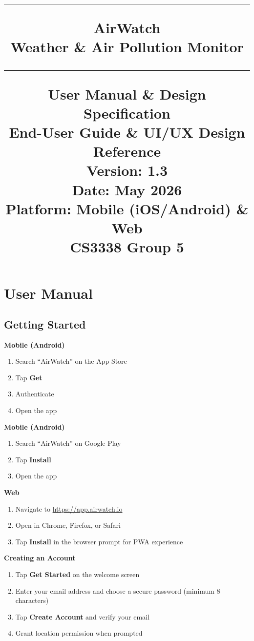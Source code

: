 \documentclass[11pt]{article}
\title{\noindent\rule{\textwidth}{0.5pt}
\huge{AirWatch} \vspace{0.1cm}\\ \large{Weather \& Air Pollution Monitor\\}
\noindent\rule{\textwidth}{0.5pt}
\Large{User Manual \& Design Specification \\\small{End-User Guide \& UI/UX Design Reference\\}}
\vspace{0.1cm}
\small{ 
Version: 1.3\\ 
Date: May 2026\\
Platform: Mobile (iOS/Android) \& Web\\
CS3338 Group  5}
}
\date{}
\begin{document}
\maketitle

\tableofcontents
\newpage



\section{User Manual}

\subsection{Getting Started}

\textbf{Mobile (Android)}
\begin{enumerate}
    \item Search ``AirWatch'' on the App Store
    \item Tap \textbf{Get}
    \item Authenticate
    \item Open the app
\end{enumerate}

\textbf{Mobile (Android)}
\begin{enumerate}
    \item Search ``AirWatch'' on Google Play
    \item Tap \textbf{Install}
    \item Open the app
\end{enumerate}

\textbf{Web}
\begin{enumerate}
    \item Navigate to \url{https://app.airwatch.io}
    \item Open in Chrome, Firefox, or Safari
    \item Tap \textbf{Install} in the browser prompt for PWA experience
\end{enumerate}

\textbf{Creating an Account}

\begin{enumerate}
    \item Tap \textbf{Get Started} on the welcome screen
    \item Enter your email address and choose a secure password (minimum 8 characters)
    \item Tap \textbf{Create Account} and verify your email
    \item Grant location permission when prompted
\end{enumerate}
\end{document}
